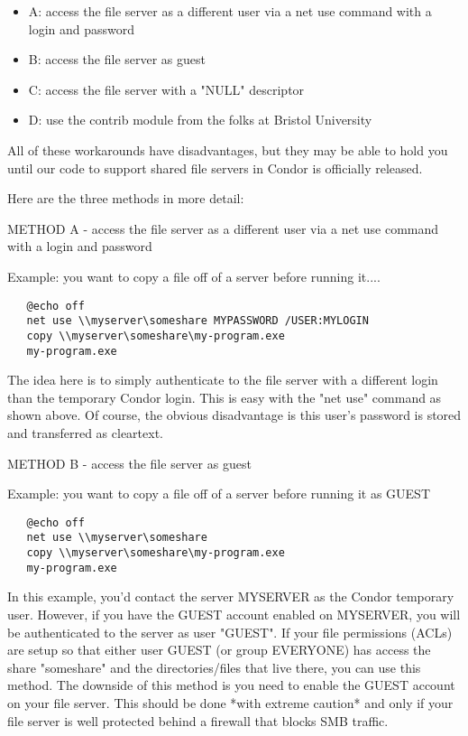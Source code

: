 \begin{itemize}
\item A: access the file server as a different user via a net use command with a 
login and password
\item B: access the file server as guest
\item C: access the file server with a "NULL" descriptor
\item D: use the contrib module from the folks at Bristol University
\end{itemize}

All of these workarounds have disadvantages, but they may be able to hold 
you until our code to support shared file servers in Condor is officially 
released.

Here are the three methods in more detail:

METHOD A - access the file server as a different user via a net use command 
with a login and password

Example: you want to copy a file off of a server before running it....

\begin{verbatim}
   @echo off
   net use \\myserver\someshare MYPASSWORD /USER:MYLOGIN
   copy \\myserver\someshare\my-program.exe
   my-program.exe
\end{verbatim}

The idea here is to simply authenticate to the file server with a different 
login than the temporary Condor login.  This is easy with the "net use" 
command as shown above.  Of course, the obvious disadvantage is this user's 
password is stored and transferred as cleartext.

METHOD B - access the file server as guest

Example: you want to copy a file off of a server before running it as GUEST

\begin{verbatim}
   @echo off
   net use \\myserver\someshare
   copy \\myserver\someshare\my-program.exe
   my-program.exe
\end{verbatim}

In this example, you'd contact the server MYSERVER as the Condor temporary 
user.  However, if you have the GUEST account enabled on MYSERVER, you will 
be authenticated to the server as user "GUEST".  If your file permissions 
(ACLs) are setup so that either user GUEST (or group EVERYONE) has access 
the share "someshare" and the directories/files that live there, you can 
use this method.  The downside of this method is you need to enable the 
GUEST account on your file server.   \Warn This should be done *with 
extreme caution* and only if your file server is well protected behind a 
firewall that blocks SMB traffic.

